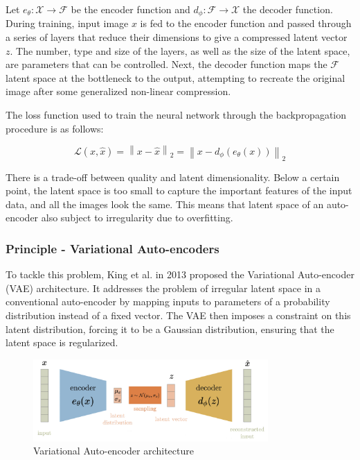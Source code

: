 \documentclass{article}
\begin{document}
Let $e_{\theta}:\mathcal{X}\to \mathcal{F}$ be the encoder function and $d_{\phi}:\mathcal{F}\to \mathcal{X}$ the decoder function. 
During training, input image $x$ is fed to the encoder function and passed through a series of layers that reduce their dimensions to give a compressed latent vector $z$. 
The number, type and size of the layers, as well as the size of the latent space, are parameters that can be controlled. 
Next, the decoder function maps the $\mathcal{F}$ latent space at the bottleneck to the output, attempting to recreate the original image after some generalized non-linear compression. 

The loss function used to train the neural network through the backpropagation procedure is as follows: 

\[\mathcal{L}(x,\hat{x})=\left\| x-\hat{x}\right\|_{2}=\left\| x-d_{\phi}(e_{\theta}(x)) \right\|_{2}\]

There is a trade-off between quality and latent dimensionality. Below a certain point, the latent space is too small to capture the important features of the input data, and all the images look the same.
This means that latent space of an auto-encoder also subject to irregularity due to overfitting. 

\subsubsection*{Principle - Variational Auto-encoders}
To tackle this problem, King et al. in 2013 \cite{kingma2013vae} proposed the Variational Auto-encoder (VAE) architecture. It addresses the problem of irregular latent space in a conventional auto-encoder by mapping inputs to parameters of a probability distribution instead of a fixed vector.
The VAE then imposes a constraint on this latent distribution, forcing it to be a Gaussian distribution, ensuring that the latent space is regularized.

\begin{figure}[H]
    \centering
    \includegraphics[width=0.8\textwidth]{images/vae.png}
    \caption{Variational Auto-encoder architecture}
\end{figure}
\end{document}
